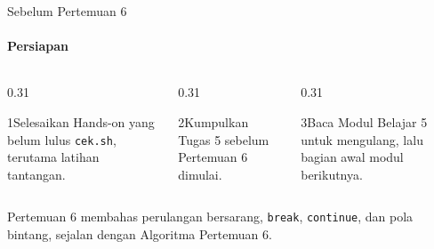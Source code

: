 \documentclass[t]{beamer}
\begin{document}
\begin{frame}{Sebelum Pertemuan 6}
\framesubtitle{Persiapan}
\begin{columns}[T]
\begin{column}{0.31\textwidth}
\begin{Langkah}{1}{Selesaikan}
Hands-on yang belum lulus \texttt{cek.sh}, terutama latihan tantangan.
\end{Langkah}
\end{column}
\begin{column}{0.31\textwidth}
\begin{Langkah}{2}{Kumpulkan}
Tugas 5 sebelum Pertemuan 6 dimulai.
\end{Langkah}
\end{column}
\begin{column}{0.31\textwidth}
\begin{Langkah}{3}{Baca}
Modul Belajar 5 untuk mengulang, lalu bagian awal modul berikutnya.
\end{Langkah}
\end{column}
\end{columns}
\vspace{10pt}
Pertemuan 6 membahas perulangan bersarang, \texttt{break}, \texttt{continue}, dan pola bintang, sejalan dengan Algoritma Pertemuan 6.
\end{frame}

\end{document}
